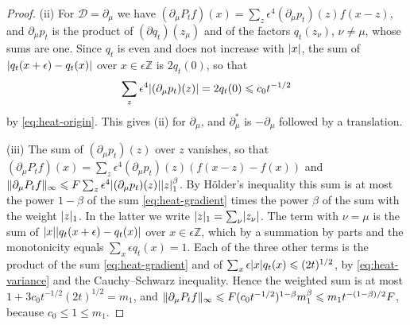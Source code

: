 \documentclass[11pt]{preprint}
\DeclarePairedDelimiter{\abs}{\lvert}{\rvert}
\DeclarePairedDelimiter{\norm}{\lVert}{\rVert}
\numberwithin{equation}{section}
\begin{document}
\begin{proof}
(ii) For $\mathcal D = \partial_\mu$ we have $(\partial_\mu P_tf)(x) = \sum_z\epsilon^4(\partial_\mu p_t)(z)f(x - z)$, and $\partial_\mu p_t$ is the product of $(\partial q_t)(z_\mu)$ and of the factors $q_t(z_\nu)$, $\nu \neq \mu$, whose sums are one. Since $q_t$ is even and does not increase with $\abs x$, the sum of $\abs{q_t(x + \epsilon) - q_t(x)}$ over $x \in \epsilon\mathbb Z$ is $2q_t(0)$, so that
\begin{equation}\label{eq:heat-gradient}
    \sum_z\epsilon^4\abs{(\partial_\mu p_t)(z)} = 2q_t(0) \leqslant c_0t^{-1/2}
\end{equation}
by \eqref{eq:heat-origin}. This gives (ii) for $\partial_\mu$, and $\partial^*_\mu$ is $-\partial_\mu$ followed by a translation.

(iii) The sum of $(\partial_\mu p_t)(z)$ over $z$ vanishes, so that $(\partial_\mu P_tf)(x) = \sum_z\epsilon^4(\partial_\mu p_t)(z)(f(x - z) - f(x))$ and $\norm{\partial_\mu P_tf}_\infty \leqslant F\sum_z\epsilon^4\abs{(\partial_\mu p_t)(z)}\abs z_1^\beta$. By H\"older's inequality this sum is at most the power $1 - \beta$ of the sum \eqref{eq:heat-gradient} times the power $\beta$ of the sum with the weight $\abs z_1$. In the latter we write $\abs z_1 = \sum_\nu\abs{z_\nu}$. The term with $\nu = \mu$ is the sum of $\abs x\abs{q_t(x + \epsilon) - q_t(x)}$ over $x \in \epsilon\mathbb Z$, which by a summation by parts and the monotonicity equals $\sum_x\epsilon q_t(x) = 1$. Each of the three other terms is the product of the sum \eqref{eq:heat-gradient} and of $\sum_x\epsilon\abs xq_t(x) \leqslant (2t)^{1/2}$, by \eqref{eq:heat-variance} and the Cauchy--Schwarz inequality. Hence the weighted sum is at most $1 + 3c_0t^{-1/2}(2t)^{1/2} = m_1$, and $\norm{\partial_\mu P_tf}_\infty \leqslant F(c_0t^{-1/2})^{1-\beta}m_1^\beta \leqslant m_1t^{-(1-\beta)/2}F$, because $c_0 \leqslant 1 \leqslant m_1$.
\end{proof}
\end{document}
